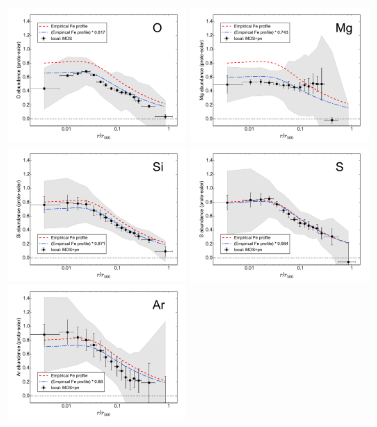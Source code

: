 \documentclass{aa}
\begin{document}
\begin{figure}[!]
        \centering
                \includegraphics[width=0.42\textwidth]{fig_radial_stacked_O.pdf}
                \includegraphics[width=0.42\textwidth]{fig_radial_stacked_Mg.pdf}
\\
                \includegraphics[width=0.42\textwidth]{fig_radial_stacked_Si.pdf}
                \includegraphics[width=0.42\textwidth]{fig_radial_stacked_S.pdf}
\\
                \includegraphics[width=0.42\textwidth]{fig_radial_stacked_Ar.pdf}

\end{figure}
\end{document}
